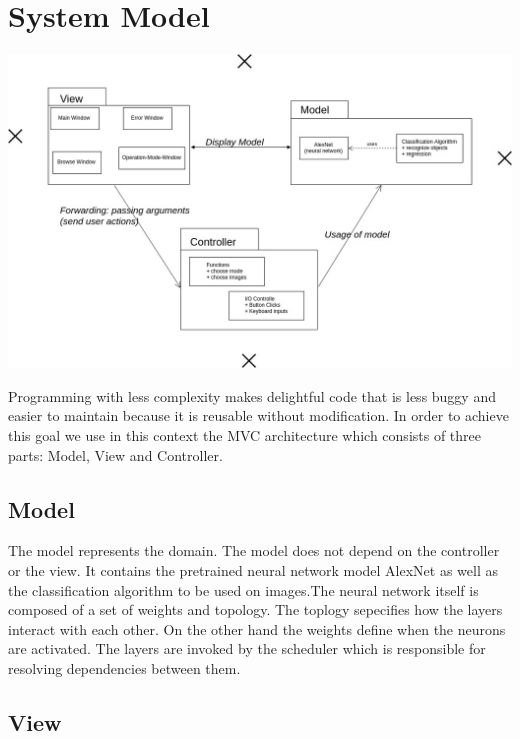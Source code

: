 \documentclass[parskip=full]{scrartcl}
\begin{document}
\pagebreak





\section{System Model}

\begin{center}
\includegraphics[width=1.0\textwidth]{images/MVC.jpg}
\end{center}

Programming with less complexity makes delightful code that is less buggy and easier to maintain because it is reusable without modification. In order to achieve this goal we use in this context the MVC architecture which consists of three parts: Model, View and Controller.

\subsection{Model}

The model represents the domain. The model does not depend on the controller or the view. It contains the pretrained neural network model AlexNet as well as the classification algorithm to be used on images.The neural network itself is composed of a set of weights and topology. The toplogy sepecifies how the layers interact with each other. On the other hand the weights define when the neurons are activated. The layers are invoked by the scheduler which is responsible for resolving dependencies between them.

\subsection{View}
\end{document}
